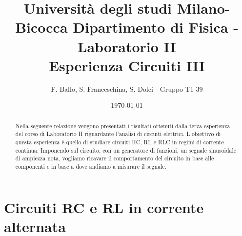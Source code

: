 \documentclass[letterpaper,12pt]{article}
\begin{document}
\title{{\small Università degli studi Milano-Bicocca  Dipartimento di Fisica - Laboratorio II }\\
	Esperienza Circuiti III}
\author{F. Ballo, S. Franceschina, S. Dolci - Gruppo T1 39}
\date{\today}
\maketitle
\thispagestyle{logoheader}


\begin{abstract}
	Nella seguente relazione vengono presentati i risultati ottenuti dalla terza esperienza del corso di Laboratorio II riguardante l'analisi di circuiti elettrici. L'obiettivo di questa esperienza è quello di studiare circuiti RC, RL e RLC in regimi di corrente continua. Imponendo sul circuito, con un generatore di funzioni, un segnale sinusoidale di ampiezza nota, vogliamo ricavare il comportamento del circuito in base alle componenti e in base a dove andiamo a misurare il segnale.
	\begin{adjustwidth}{-1cm}{-1cm}
	\end{adjustwidth}
\end{abstract}
\tableofcontents
\newpage

\section{Circuiti RC e RL in corrente alternata}
\end{document}
